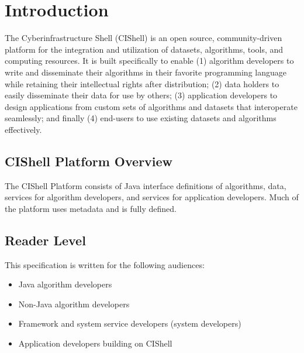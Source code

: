 \chapter{Introduction}

The Cyberinfrastructure Shell (CIShell) is an open source, community-driven
platform for the integration and utilization of datasets, algorithms, tools, and
computing resources. It is built specifically to enable (1) algorithm developers
to write and disseminate their algorithms in their favorite programming language
while retaining their intellectual rights after distribution; (2) data holders to
easily disseminate their data for use by others; (3) application developers to
design applications from custom sets of algorithms and datasets that interoperate
seamlessly; and finally (4) end-users to use existing datasets and algorithms
effectively.

\section{CIShell Platform Overview}

The CIShell Platform consists of Java interface definitions of algorithms, data,
services for algorithm developers, and services for application developers. Much
of the platform uses metadata and is fully defined.



\section{Reader Level}

This specification is written for the following audiences:
\begin{itemize}
  \item Java algorithm developers
  \item Non-Java algorithm developers
  \item Framework and system service developers (system developers)
  \item Application developers building on CIShell
\end{itemize}

